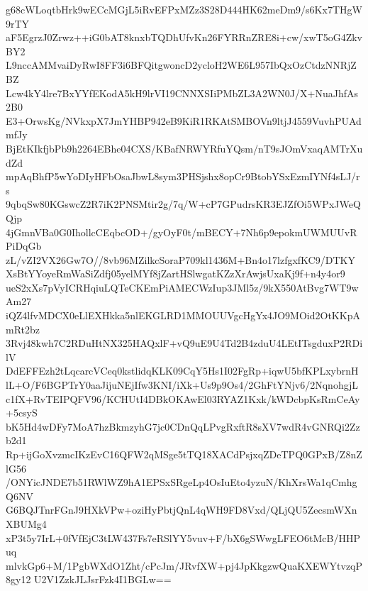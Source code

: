 g68cWLoqtbHrk9wECcMGjL5iRvEFPxMZz3S28D444HK62meDm9/s6Kx7THgW9rTY
aF5EgrzJ0Zrwz++iG0bAT8knxbTQDhUfvKn26FYRRnZRE8i+cw/xwT5oG4ZkvBY2
L9nccAMMvaiDyRwI8FF3i6BFQitgwoncD2ycloH2WE6L957IbQxOzCtdzNNRjZBZ
Lcw4kY4lre7BxYYfEKodA5kH9lrVI19CNNXSIiPMbZL3A2WN0J/X+NuaJhfAs2B0
E3+OrwsKg/NVkxpX7JmYHBP942eB9KiR1RKAtSMBOVn9ltjJ4559VuvhPUAdmfJy
BjEtKIkfjbPb9h2264EBhe04CXS/KBafNRWYRfuYQsm/nT9sJOmVxaqAMTrXudZd
mpAqBhfP5wYoDIyHFbOsaJbwL8sym3PHSjshx8opCr9BtobYSxEzmIYNf4sLJ/rs
9qbqSw80KGswcZ2R7iK2PNSMtir2g/7q/W+cP7GPudrsKR3EJZfOi5WPxJWeQQjp
4jGmnVBa0G0IhollcCEqbcOD+/gyOyF0t/mBECY+7Nh6p9epokmUWMUUvRPiDqGb
zL/vZI2VX26Gw7O//8vb96MZilkcSoraP709kl1436M+Bn4o17lzfgxfKC9/DTKY
XsBtYYoyeRmWaSiZdfj05yelMYf8jZartHSlwgatKZzXrAwjsUxaKj9f+n4y4or9
ueS2xXs7pVyICRHqiuLQTeCKEmPiAMECWzIup3JMl5z/9kX550AtBvg7WT9wAm27
iQZ4lfvMDCX0eLlEXHkka5nlEKGLRD1MMOUUVgcHgYx4JO9MOid2OtKKpAmRt2bz
3Rvj48kwh7C2RDuHtNX325HAQxlF+vQ9uE9U4Td2B4zduU4LEtITsgduxP2RDilV
DdEFFEzh2tLqcarcVCeq0kstlidqKLK09CqY5Hs1I02FgRp+iqwU5bfKPLxybrnH
lL+O/F6BGPTrY0aaJijuNEjIfw3KNI/iXk+Us9p9Os4/2GhFtYNjv6/2NqnohgjL
c1fX+RvTEIPQFV96/KCHUtI4DBkOKAwEl03RYAZ1Kxk/kWDcbpKsRmCeAy+5csyS
bK5Hd4wDFy7MoA7hzBkmzyhG7jc0CDnQqLPvgRxftR8sXV7wdR4vGNRQi2Zzb2d1
Rp+ijGoXvzmcIKzEvC16QFW2qMSge5tTQ18XACdPsjxqZDeTPQ0GPxB/Z8nZlG56
/ONYicJNDE7b51RWlWZ9hA1EPSxSRgeLp4OsIuEto4yzuN/KhXrsWa1qCmhgQ6NV
G6BQJTnrFGnJ9HXkVPw+oziHyPbtjQnL4qWH9FD8Vxd/QLjQU5ZecsmWXnXBUMg4
xP3t5y7IrL+0fVfEjC3tLW437Fs7eRSlYY5vuv+F/bX6gSWwgLFEO6tMcB/HHPuq
mlvkGp6+M/1PgbWXdO1Zht/cPcJm/JRvfXW+pj4JpKkgzwQuaKXEWYtvzqP8gy12
U2V1ZzkJLJsrFzk4I1BGLw==
